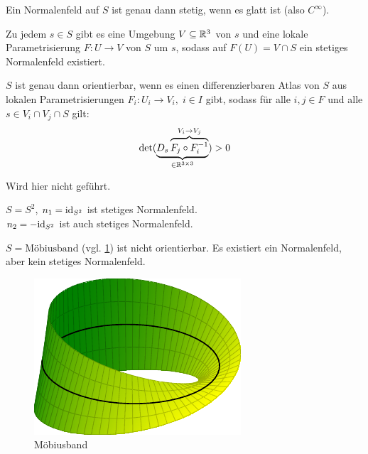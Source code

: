 \begin{bemerkung}%
    \begin{bemenum}
        \item Ein Normalenfeld auf $S$ ist genau dann stetig, wenn es
              glatt ist (also $C^\infty$).
        \item Zu jedem $s \in S$ gibt es eine Umgebung $V \subseteq \mathbb{R}^3$
              von $s$ und eine lokale Parametrisierung $F: U \rightarrow V$
              von $S$ um $s$, sodass auf $F(U) = V \cap S$
              ein stetiges Normalenfeld existiert.
        \item $S$ ist genau dann orientierbar, wenn es einen 
              differenzierbaren Atlas von $S$ aus lokalen Parametrisierungen
              $F_i: U_i \rightarrow V_i,\;i \in I$ gibt, sodass
              für alle $i, j \in F$ und alle $s \in V_i \cap V_j \cap S$
              gilt:
              \[\det(\underbrace{D_s \overbrace{F_j \circ F_i^{-1}}^{V_i \rightarrow V_j}}_{\in \mathbb{R}^{3 \times 3}}) > 0\]
    \end{bemenum}
\end{bemerkung}

\begin{beweis}
    Wird hier nicht geführt.%
\end{beweis}

\begin{beispiel}[Normalenfelder]
    \begin{bspenum}
        \item $S = S^2$, $n_1 = \textnormal{id}_{S^2}$ ist stetiges Normalenfeld.\\
              $n_2 = - \textnormal{id}_{S^2}$ ist auch stetiges Normalenfeld.
        \item $S = \text{Möbiusband}$ (vgl. \cref{fig:moebius-strip})
              ist nicht orientierbar. Es existiert ein Normalenfeld,
              aber kein stetiges Normalenfeld.
    \end{bspenum}
\end{beispiel}

\begin{figure}[htp]
    \centering
    \includegraphics[width=0.5\linewidth, keepaspectratio]{figures/moebius-strip.pdf} 
    \caption{Möbiusband}
    \label{fig:moebius-strip}
\end{figure}
